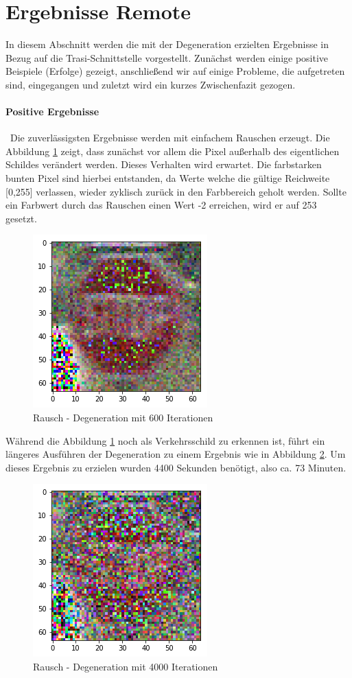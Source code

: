\section{Ergebnisse Remote}
\label{sec:DegenerationErgebnisse}
In diesem Abschnitt werden die mit der Degeneration erzielten Ergebnisse in Bezug auf die Trasi-Schnittstelle vorgestellt. Zunächst werden einige positive Beispiele (Erfolge) gezeigt, anschließend wir auf einige Probleme, die aufgetreten sind, eingegangen und zuletzt wird ein kurzes Zwischenfazit gezogen. 
\paragraph{Positive Ergebnisse} ~\newline Die zuverlässigsten Ergebnisse werden mit einfachem Rauschen erzeugt. Die Abbildung \ref{fig:stoptiefe600} zeigt, dass zunächst vor allem die Pixel außerhalb des eigentlichen Schildes verändert werden. Dieses Verhalten wird erwartet. Die farbstarken bunten Pixel sind hierbei entstanden, da Werte welche die gültige Reichweite [0,255] verlassen, wieder zyklisch zurück in den Farbbereich geholt werden. Sollte ein Farbwert durch das Rauschen einen Wert -2 erreichen, wird er auf 253 gesetzt.  

\begin{figure}[h]
	\centering
	\includegraphics[width=0.4\linewidth]{Images/DegenSamples/StopTiefe600}
	\caption[Degeneration Tiefe 600]{Rausch - Degeneration mit 600 Iterationen}
	\label{fig:stoptiefe600}
\end{figure}

Während die Abbildung \ref{fig:stoptiefe600} noch als Verkehrsschild zu erkennen ist, führt ein längeres Ausführen der Degeneration zu einem Ergebnis wie in Abbildung \ref{fig:stoptiefe4000}. Um dieses Ergebnis zu erzielen wurden 4400 Sekunden benötigt, also ca. 73 Minuten.

\begin{figure}[h]
	\centering
	\includegraphics[width=0.4\linewidth]{Images/DegenSamples/StopTiefe4000}
	\caption[Degeneration Tiefe 4000]{Rausch - Degeneration mit 4000 Iterationen}
	\label{fig:stoptiefe4000}
\end{figure}

